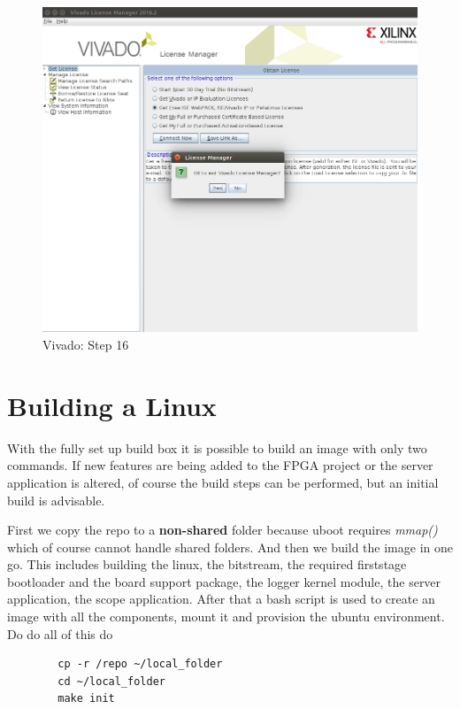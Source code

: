 \begin{figure}
    \centering
    \includegraphics[width=1\textwidth,trim={0 8cm 0 8cm},clip]{images/devguide/vivado-install-22.png}
    \caption[Vivado: Step 16]{%
        Vivado: Step 16
    }
    \label{fig:devguide:vivado}
\end{figure}

\section{Building a Linux}
\label{sec:devguide:fpga_toolchain:linux}

With the fully set up build box it is possible to build an image with only two commands.
If new features are being added to the FPGA project or the server application is altered, of course the build steps can be performed, but an initial build is advisable.

First we copy the repo to a \textbf{non-shared} folder because uboot requires \textit{mmap()} which of course cannot handle shared folders.
And then we build the image in one go. This includes building the linux, the bitstream, the required firststage bootloader and the board support package, the logger kernel module, the server application, the scope application.
After that a bash script is used to create an image with all the components, mount it and provision the ubuntu environment.
Do do all of this do

\begin{listing}
    \begin{verbatim}
        cp -r /repo ~/local_folder
        cd ~/local_folder
        make init
    \end{verbatim}
\end{listing}

